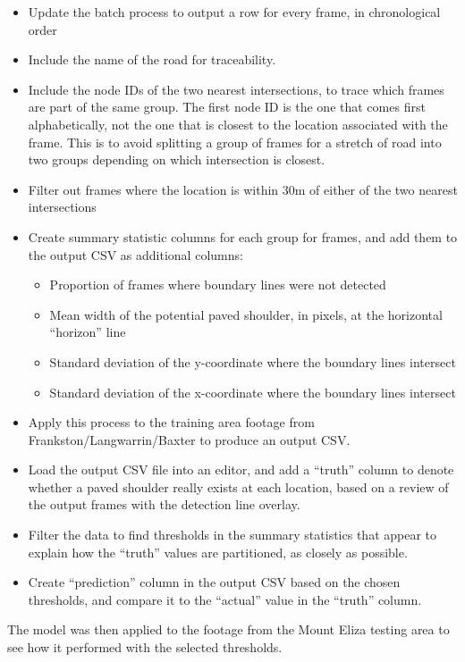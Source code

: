 \documentclass[11pt,twoside]{report}
\begin{document}
\begin{itemize}
\item{Update the batch process to output a row for every frame, in chronological order}
\item{Include the name of the road for traceability.}
\item{Include the node IDs of the two nearest intersections, to trace which frames are part of the same group.  The first node ID is the one that comes first alphabetically, not the one that is closest to the location associated with the frame.  This is to avoid splitting a group of frames for a stretch of road into two groups depending on which intersection is closest.}
\item{Filter out frames where the location is within 30m of either of the two nearest intersections}
\item{Create summary statistic columns for each group for frames, and add them to the output CSV as additional columns:
	\begin{itemize}
	\item{Proportion of frames where boundary lines were not detected}
	\item{Mean width of the potential paved shoulder, in pixels, at the horizontal ``horizon'' line}
	\item{Standard deviation of the y-coordinate where the boundary lines intersect}
	\item{Standard deviation of the x-coordinate where the boundary lines intersect}
	\end{itemize}
}
\item{Apply this process to the training area footage from Frankston/Langwarrin/Baxter to produce an output CSV.}
\item{Load the output CSV file into an editor, and add a ``truth'' column to denote whether a paved shoulder really exists at each location, based on a review of the output frames with the detection line overlay.}
\item{Filter the data to find thresholds in the summary statistics that appear to explain how the ``truth'' values are partitioned, as closely as possible.}
\item{Create ``prediction'' column in the output CSV based on the chosen thresholds, and compare it to the ``actual'' value in the ``truth'' column.}
\end{itemize}

The model was then applied to the footage from the Mount Eliza testing area to see how it performed with the selected thresholds.
\end{document}
